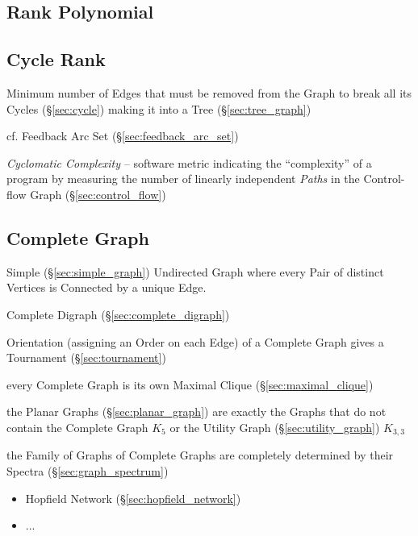 \subsection{Rank Polynomial}\label{sec:rank_polynomial}



\subsection{Cycle Rank}\label{sec:cycle_rank}

Minimum number of Edges that must be removed from the Graph to break all its
Cycles (\S\ref{sec:cycle}) making it into a Tree (\S\ref{sec:tree_graph})

\fist cf. Feedback Arc Set (\S\ref{sec:feedback_arc_set})

\emph{Cyclomatic Complexity} -- software metric indicating the ``complexity''
of a program by measuring the number of linearly independent \emph{Paths} in
the Control-flow Graph (\S\ref{sec:control_flow})



\subsection{Complete Graph}\label{sec:complete_graph}

Simple (\S\ref{sec:simple_graph}) Undirected Graph where every Pair of distinct
Vertices is Connected by a unique Edge.

Complete Digraph (\S\ref{sec:complete_digraph})

Orientation (assigning an Order on each Edge) of a Complete Graph gives a
Tournament (\S\ref{sec:tournament})

every Complete Graph is its own Maximal Clique (\S\ref{sec:maximal_clique})

the Planar Graphs (\S\ref{sec:planar_graph}) are exactly the Graphs that do not
contain the Complete Graph $K_5$ or the Utility Graph
(\S\ref{sec:utility_graph}) $K_{3,3}$

the Family of Graphs of Complete Graphs are completely determined by their
Spectra (\S\ref{sec:graph_spectrum})

\begin{itemize}
  \item Hopfield Network (\S\ref{sec:hopfield_network})
  \item ...
\end{itemize}



